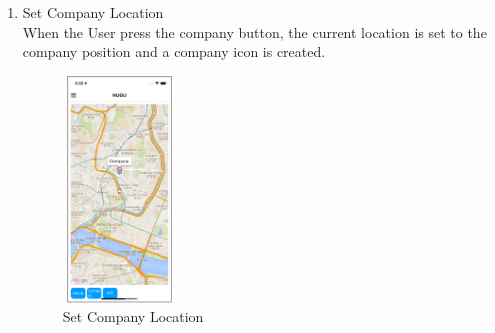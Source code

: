 \documentclass[conference]{IEEEtran}
\begin{document}
\begin{enumerate}
    \item Set Company Location\\
    When the User press the company button, the current location is set to the company position and a company icon is created.
    \begin{figure}[htbp]
        \centering
        \includegraphics[width=3cm, height=6cm]{images/figure16.png}
        \caption{Set Company Location}
    \end{figure}
    
    
\end{enumerate}
\end{document}
